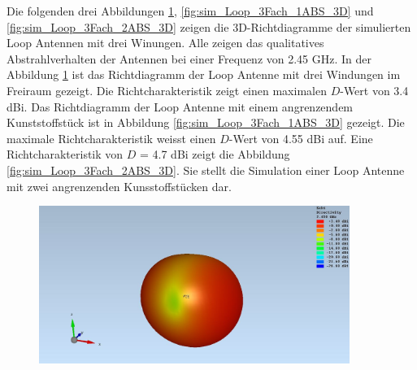 \newpage
\clearpage
Die folgenden drei Abbildungen \ref{fig:sim_Loop_3Fach_freiraum_3D}, \ref{fig:sim_Loop_3Fach_1ABS_3D} und \ref{fig:sim_Loop_3Fach_2ABS_3D} zeigen die 3D-Richtdiagramme der simulierten Loop Antennen mit drei Winungen. Alle zeigen das qualitatives Abstrahlverhalten der Antennen bei einer Frequenz von 2.45 GHz. In der Abbildung \ref{fig:sim_Loop_3Fach_freiraum_3D} ist das Richtdiagramm der Loop Antenne mit drei Windungen im Freiraum gezeigt. Die Richtcharakteristik zeigt einen maximalen $D$-Wert von 3.4 dBi. Das Richtdiagramm der Loop Antenne mit einem angrenzendem Kunststoffstück ist in Abbildung \ref{fig:sim_Loop_3Fach_1ABS_3D} gezeigt. Die maximale Richtcharakteristik weisst einen $D$-Wert von 4.55 dBi auf. Eine Richtcharakteristik von $D$ = 4.7 dBi zeigt die Abbildung \ref{fig:sim_Loop_3Fach_2ABS_3D}. Sie stellt die Simulation einer Loop Antenne mit zwei angrenzenden Kunsstoffstücken dar.
\begin{figure}[h]
	\begin{center}
		\includegraphics[width=0.9\textwidth]{content/bilder/Evaluation/Loop/ohneABS/EM_Far_Field_Loop_Coil_ohneABS.JPG}
		\label{fig:sim_Loop_3Fach_freiraum_3D}
	\end{center}
\end{figure}
